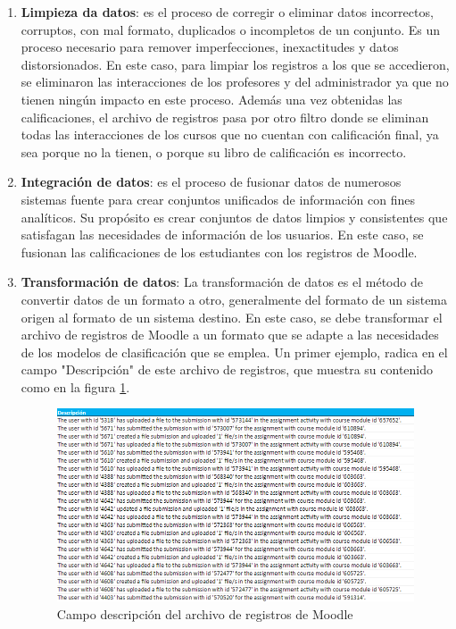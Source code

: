\begin{enumerate}
    \item \textbf{Limpieza da datos}: es el proceso de corregir o eliminar datos incorrectos, corruptos, con mal formato, duplicados o incompletos de un conjunto. Es un proceso necesario para remover imperfecciones, inexactitudes y datos distorsionados. En este caso, para limpiar los registros a los que se accedieron, se eliminaron las interacciones de los profesores y del administrador ya que no tienen ningún impacto en este proceso. Además una vez obtenidas las calificaciones, el archivo de registros pasa por otro filtro donde se eliminan todas las interacciones de los cursos que no cuentan con calificación final, ya sea porque no la tienen, o porque su libro de calificación es incorrecto.
    \item \textbf{Integración de datos}: es el proceso de fusionar datos de numerosos sistemas fuente para crear conjuntos unificados de información con fines analíticos. Su propósito es crear conjuntos de datos limpios y consistentes que satisfagan las necesidades de información de los usuarios. En este caso, se fusionan las calificaciones de los estudiantes con los registros de Moodle.
    \item \textbf{Transformación de datos}: La transformación de datos es el método de convertir datos de un formato a otro, generalmente del formato de un sistema origen al formato de un sistema destino. En este caso, se debe transformar el archivo de registros de Moodle a un formato que se adapte a las necesidades de los modelos de clasificación que se emplea. Un primer ejemplo, radica en el campo "Descripción" de este archivo de registros, que muestra su contenido como en la figura \ref{descrip}.  
    
    
    \begin{figure}[htb]
        \centering
        \includegraphics[width = 1 \textwidth]{Graphics/Pasted image 20240101131345.png}
        \caption{Campo descripción del archivo de registros de Moodle}
        \label{descrip}
    \end{figure} 


\end{enumerate}
